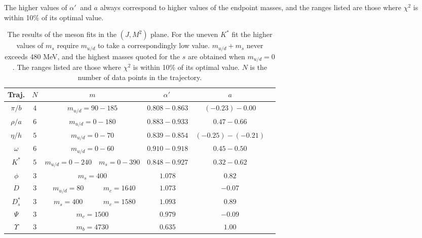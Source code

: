 \documentclass[11pt,a4]{article}
\newcommand{\alp}{\ensuremath{\alpha'\:}}
\newcommand{\mud}{m_{u/d}}
\begin{document}
The higher values of \(\alp\) and \(a\) always correspond to higher values of the endpoint masses, and the ranges listed are those where \(\chi^2\) is within 10\% of its optimal value.
			\begin{table}[tp!] \centering
					\begin{tabular}{|c|c|cc|c|c|c|} \hline
					Traj. & \(N\) & \multicolumn{2}{|c|}{\(m\)} & \alp & \(a\) \\ \hline
					
					\(\pi/b\) & \(4\) & \multicolumn{2}{|c|}{\(\mud = 90-185\)} & \(0.808-0.863\) & \((-0.23)-0.00\) \\
					
					\(\rho/a\) & \(6\) & \multicolumn{2}{|c|}{\(\mud =0-180\)} & \(0.883-0.933\) & \(0.47-0.66\) \\
				
					\(\eta/h\) &  \(5\) & \multicolumn{2}{|c|}{\(\mud = 0-70\)} & \(0.839-0.854\) & \((-0.25)-(-0.21)\) \\
					
					\(\omega\) &  \(6\) & \multicolumn{2}{|c|}{\(\mud = 0-60\)}& \(0.910-0.918\) & \(0.45-0.50\) \\
					
					\(K^*\) &  \(5\) & \(\mud = 0-240\) & \(m_s = 0-390\) & \(0.848-0.927\) & \(0.32-0.62\) \\
					
					\(\phi\) &  \(3\) & \multicolumn{2}{|c|}{\(m_s = 400\)} & \(1.078\) & \(0.82\) \\
					
					\(D\) &  \(3\) & \(\mud = 80\) & \(m_c = 1640\) & \(1.073\) & \(-0.07\) \\
					
					\(D^*_s\) & \(3\) & \(m_s = 400\) & \(m_c = 1580\) & \(1.093\) & \(0.89\) \\
					
					\(\Psi\) &  \(3\) & \multicolumn{2}{|c|}{\(m_c = 1500\)} & \(0.979\) & \(-0.09\) \\
					
					\(\Upsilon\) &  \(3\) & \multicolumn{2}{|c|}{\(m_b = 4730\)} & \(0.635\) & \(1.00\) \\ \hline \end{tabular}
					
					\caption{\label{tab:mes_j} The results of the meson fits in the \((J,M^2)\) plane. For the uneven \(K^*\) fit the higher values of \(m_s\) require \(\mud\) to take a correspondingly low value. \(\mud + m_s\) never exceeds 480 MeV, and the highest masses quoted for the \(s\) are obtained when \(\mud = 0\). The ranges listed are those where \(\chi^2\) is within 10\% of its optimal value. \(N\) is the number of data points in the trajectory.}
				\end{table}
				
\end{document}
